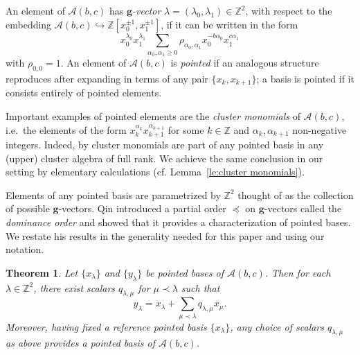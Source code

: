 \documentclass{amsart}
\newtheorem{theorem}{Theorem}
\numberwithin{theorem}{section}
\newcommand{\bfg}{\boldsymbol{g}}
\newcommand{\cA}{\mathcal{A}}
\newcommand{\ZZ}{\mathbb{Z}}
\newcommand{\into}{\hookrightarrow}
\begin{document}
  An element of $\cA(b,c)$ has \emph{$\bfg$-vector} $\lambda=(\lambda_0,\lambda_1)\in\ZZ^2$, with respect to the embedding ${\cA(b,c)\into\ZZ[x_0^{\pm1},x_{1}^{\pm1}]}$, if it can be written in the form
  \begin{equation}
    \label{eq:pointed}
    x_0^{\lambda_0}x_1^{\lambda_1}\sum\limits_{\alpha_0,\alpha_1 \ge 0} \rho_{\alpha_0,\alpha_1} x_0^{-b\alpha_0} x_1^{c\alpha_1}
  \end{equation}
  with $\rho_{0,0}=1$.
  An element of $\cA(b,c)$ is \emph{pointed} if an analogous structure reproduces after expanding in terms of any pair $\{x_k,x_{k+1}\}$; a basis is pointed if it consists entirely of pointed elements.

  Important examples of pointed elements are the \emph{cluster monomials} of $\cA(b,c)$, i.e.~the elements of the form $x_k^{\alpha_k}x_{k+1}^{\alpha_{k+1}}$ for some $k\in\ZZ$ and $\alpha_k,\alpha_{k+1}$ non-negative integers.
  Indeed, by \cite[Lemma 3.4.12]{Qin19} cluster monomials are part of any pointed basis in any (upper) cluster algebra of full rank.
  We achieve the same conclusion in our setting by elementary calculations (cf. Lemma~\ref{le:cluster monomials}).

  Elements of any pointed basis are parametrized by $\ZZ^2$ thought of as the collection of possible $\bfg$-vectors.
  Qin introduced a partial order $\preceq$ on $\bfg$-vectors called the \emph{dominance order} and showed that it provides a characterization of pointed bases.
  We restate his results in the generality needed for this paper and using our notation.
  \begin{theorem}
    \label{th:dominance}
    \cite[Theorem 1.2.1]{Qin19}
    Let $\{x_\lambda\}$ and $\{y_\lambda\}$ be pointed bases of $\cA(b,c)$.
    Then for each $\lambda\in\ZZ^2$, there exist scalars $q_{\lambda,\mu}$ for $\mu\prec\lambda$ such that
    \[y_\lambda=x_\lambda+\sum_{\mu\prec\lambda} q_{\lambda,\mu} x_\mu.\]
    Moreover, having fixed a reference pointed basis $\{x_\lambda\}$, any choice of scalars $q_{\lambda,\mu}$ as above provides a pointed basis of $\cA(b,c)$.
  \end{theorem}
\end{document}
